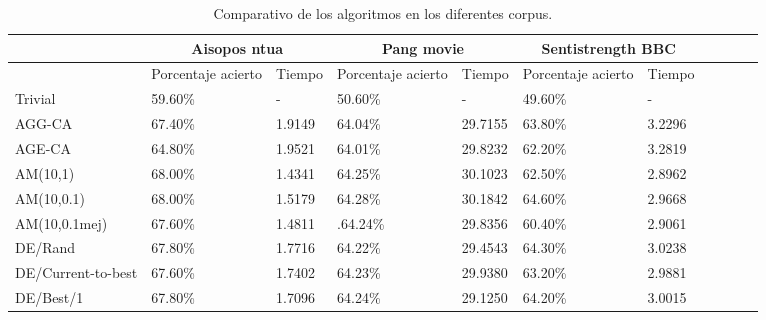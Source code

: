 \documentclass{article}
\begin{document}
\begin{table}[H]
	\begin{center}
		\resizebox{15cm}{!} {
			\begin{tabular}{|l|l|l|l|l|l|l|l|l|l|l|}
				\hline
				& \multicolumn{2}{|c|}{Aisopos ntua} & \multicolumn{2}{|c|}{Pang movie} & \multicolumn{2}{|c|}{Sentistrength BBC}\\ \hline
				& Porcentaje acierto &Tiempo & Porcentaje acierto & Tiempo & Porcentaje acierto & Tiempo\\ \hline
				Trivial& 59.60\%& - & 50.60\% &  -& 49.60\% & -\\ \hline
				AGG-CA& 67.40\%& 1.9149 &64.04\%& 29.7155 & 63.80\%& 3.2296\\ \hline
				AGE-CA& 64.80\%& 1.9521 & 64.01\% & 29.8232 & 62.20\% &3.2819\\ \hline
				AM(10,1)& 68.00\%& 1.4341 &  64.25\% & 30.1023 & 62.50\%& 2.8962\\ \hline
				AM(10,0.1)& 68.00\%& 1.5179 &64.28\% & 30.1842 & 64.60\%& 2.9668\\ \hline
				AM(10,0.1mej)& 67.60\%& 1.4811 &.64.24\% & 29.8356  & 60.40\%& 2.9061\\ \hline
				DE/Rand& 67.80\%& 1.7716 & 64.22\% & 29.4543  & 64.30\%&3.0238\\ \hline
				DE/Current-to-best& 67.60\%&  1.7402 & 64.23\% & 29.9380 & 63.20\%& 2.9881\\ \hline
				DE/Best/1& 67.80\%& 1.7096 &  64.24\%& 29.1250& 64.20\%& 3.0015\\ \hline
			\end{tabular}
		}\caption{Comparativo de los algoritmos en los diferentes corpus.}
		\label{tabla:corpus1}
	\end{center}
\end{table}
\end{document}
